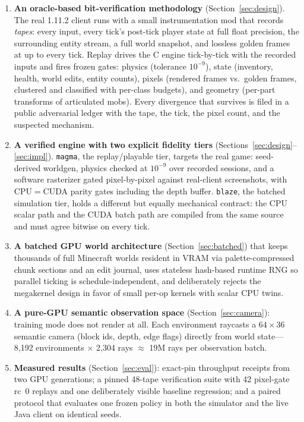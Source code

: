 \documentclass[11pt]{article}
\begin{document}
\begin{enumerate}
\item \textbf{An oracle-based bit-verification methodology} (Section~\ref{sec:design}). The real 1.11.2 client runs with a small instrumentation mod that records \emph{tapes}: every input, every tick's post-tick player state at full float precision, the surrounding entity stream, a full world snapshot, and lossless golden frames at up to every tick. Replay drives the C engine tick-by-tick with the recorded inputs and fires frozen gates: physics (tolerance $10^{-9}$), state (inventory, health, world edits, entity counts), pixels (rendered frames vs.\ golden frames, clustered and classified with per-class budgets), and geometry (per-part transforms of articulated mobs). Every divergence that survives is filed in a public adversarial ledger with the tape, the tick, the pixel count, and the suspected mechanism.
\item \textbf{A verified engine with two explicit fidelity tiers} (Sections~\ref{sec:design}--\ref{sec:impl}). \texttt{magma}, the replay/playable tier, targets the real game: seed-derived worldgen, physics checked at $10^{-9}$ over recorded sessions, and a software rasterizer gated pixel-by-pixel against real-client screenshots, with CPU$=$CUDA parity gates including the depth buffer. \texttt{blaze}, the batched simulation tier, holds a different but equally mechanical contract: the CPU scalar path and the CUDA batch path are compiled from the same source and must agree bitwise on every tick.
\item \textbf{A batched GPU world architecture} (Section~\ref{sec:batched}) that keeps thousands of full Minecraft worlds resident in VRAM via palette-compressed chunk sections and an edit journal, uses stateless hash-based runtime RNG so parallel ticking is schedule-independent, and deliberately rejects the megakernel design in favor of small per-op kernels with scalar CPU twins.
\item \textbf{A pure-GPU semantic observation space} (Section~\ref{sec:camera}): training mode does not render at all. Each environment raycasts a $64\times36$ semantic camera (block ids, depth, edge flags) directly from world state---8{,}192 environments $\times$ 2{,}304 rays $\approx$ 19M rays per observation batch.
\item \textbf{Measured results} (Section~\ref{sec:eval}): exact-pin throughput receipts from two GPU generations; a pinned 48-tape verification suite with 42 pixel-gate rc~0 replays and one deliberately visible baseline regression; and a paired protocol that evaluates one frozen policy in both the simulator and the live Java client on identical seeds.
\end{enumerate}
\end{document}
